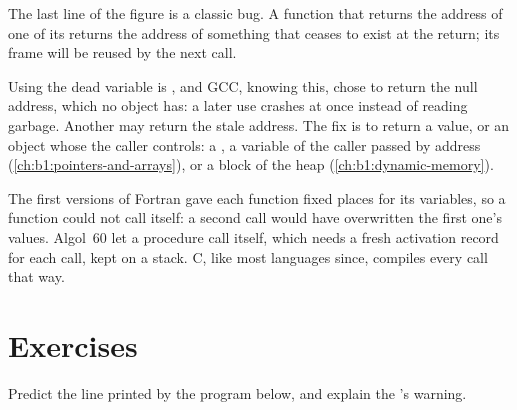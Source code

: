 The last line of the figure is a classic bug. A function that returns the address of one of its  returns the address of something that ceases to exist at the return; its frame will be reused by the
next call.

\label{lst:b1:c-functions-and-stack:dangling}

\label{out:b1:c-functions-and-stack:dangling}

Using the dead variable is , and GCC, knowing this, chose to return the null address, which no
object has: a later use crashes at once instead of reading garbage. Another  may return the stale address.
The fix is to return a value, or an object whose  the caller controls: a , a variable of the
caller passed by address (\cref{ch:b1:pointers-and-arrays}), or a block of the heap
(\cref{ch:b1:dynamic-memory}).

\begin{history}
The first versions of Fortran gave each function fixed places for its variables, so a function could not call
itself: a second call would have overwritten the first one's values. Algol~60 let a procedure call itself, which
needs a fresh activation record for each call, kept on a stack. C, like most languages since, compiles every call
that way.
\end{history}

\section{Exercises}\label{sec:b1:c-functions-and-stack:exercises}

\begin{exercise}[$\star$]\label{exo:b1:c-functions-and-stack:1}
Predict the line printed by the program below, and explain the 's warning.
\end{exercise}

